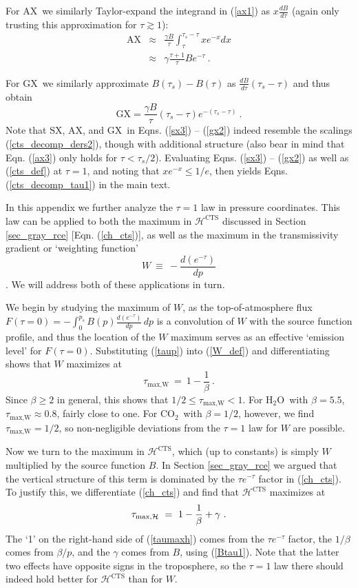 \documentclass{ametsoc}
\newcommand{\beqn}{\begin{equation}}
\newcommand{\eeqn}{\end{equation}}
\newcommand{\beqa}{\begin{eqnarray}}
\newcommand{\eeqa}{\end{eqnarray}}
\newcommand{\n}{\nonumber}
\newcommand{\eqnref}[1]{(\ref{#1})}
\newcommand{\der}[2]{\ensuremath{\frac{d #1}{d #2}}}
\newcommand{\ps}{\ensuremath{p_s}}
\newcommand{\cotwo}{\ensuremath{\mathrm{CO_2}}}
\newcommand{\htwo}{\ensuremath{\mathrm{H_2O}}}
\newcommand{\ch}{\ensuremath{\mathcal{H}}}
\newcommand{\taus}{\ensuremath{\tau_s}}
\newcommand{\taumaxw}{\ensuremath{\tau_{\text{max,W}}}}
\newcommand{\taumaxh}{\ensuremath{\tau_{\text{max,\ch}}}}
\newcommand{\SX}{\ensuremath{\mathrm{SX}}}
\newcommand{\AX}{\ensuremath{\mathrm{AX}}}
\newcommand{\GX}{\ensuremath{\mathrm{GX}}}
\newcommand{\CTS}{\ensuremath{\mathrm{CTS}}}
\begin{document}
 For \AX\ we similarly Taylor-expand the integrand in \eqnref{ax1} as $x\frac{d B}{d \tau}$ (again only trusting this approximation for  $\tau \gtrsim 1$):
\beqa
 	\AX &  \approx  &    \frac{\gamma B}{ \tau} \int_\tau^{\taus - \tau} x e^{-x} dx \n 	  \\
		   &  \approx  & \gamma \frac{\tau+1}{\tau}B e^{-\tau}  \ . \label{ax3} 
\eeqa

For \GX\  we similarly approximate $B(\taus) - B(\tau)$ as $\der{B}{\tau} (\taus-\tau)$ and thus obtain
\beqn
	\GX  =    \frac{\gamma B}{\tau}(\taus-\tau)e^{-(\taus-\tau)}  \ .
	\label{gx2}
\eeqn
Note that \SX, \AX, and \GX\  in  Eqns. \eqnref{sx3} -- \eqnref{gx2} indeed resemble the scalings \eqnref{cts_decomp_ders2}, though with additional structure (also bear in mind that Eqn. \eqnref{ax3} only holds for $\tau < \taus/2$).  Evaluating Eqns. \eqnref{sx3} -- \eqnref{gx2} as well as  \eqnref{cts_def} at $\tau=1$, and noting that $xe^{-x}\leq 1/e$, then yields Eqns. \eqnref{cts_decomp_tau1} in the main text.


\appendix[B]
\label{appendix_tau1}
In this appendix we further analyze the $\tau=1$ law in pressure coordinates. This law can be applied to both the maximum in $\ch^{\CTS}$  discussed in Section \ref{sec_gray_rce} [Eqn. \eqnref{ch_cts}], as well as the maximum in the transmissivity gradient or `weighting function' 
\beqn
	W\ \equiv \ - \der{(e^{-\tau})}{p}
\label{W_def}
\eeqn
 \citep[e.g.][]{wallace2006,petty2006}. We will address both of these applications in turn. 

We begin by studying the maximum of $W$, as the top-of-atmosphere flux $F(\tau=0)=-\int_0^{\ps} B(p)\der{(e^{-\tau})}{p}\, dp$ is a convolution of $W$ with the source function profile, and thus the location of the $W$ maximum serves as an effective `emission level' for $F(\tau=0)$. Substituting \eqnref{taup} into \eqnref{W_def} and differentiating shows that $W$ maximizes at
\beqn
	\taumaxw \ = \ 1 - \frac{1}{\beta}  \ .
	\label{taumaxw}
\eeqn
Since $\beta \geq 2 $ in general, this shows that $1/2 \leq \taumaxw  < 1$. For \htwo\ with $\beta = 5.5$, $\taumaxw \approx 0.8$, fairly close to one. For \cotwo\ with $\beta = 1/2$, however, we find $\taumaxw = 1/2$, so non-negligible deviations from the $\tau=1$ law for $W$ are possible.

Now we turn to the maximum in $\ch^{\CTS}$, which (up to constants) is simply $W$ multiplied by the source function $B$. In Section \ref{sec_gray_rce} we argued that the vertical structure of this term is dominated by the $\tau e^{-\tau}$ factor in \eqnref{ch_cts}. To justify this, we  differentiate \eqnref{ch_cts} and find that $\ch^{\CTS}$ maximizes at 
\beqn
	\taumaxh \ = \ 1 - \frac{1}{\beta}  + \gamma \ .
	\label{taumaxh}
\eeqn
The `1' on the right-hand side of \eqnref{taumaxh} comes from the $\tau e^{-\tau}$ factor, the $1/\beta$ comes from $\beta/p$, and the $\gamma$ comes from $B$, using \eqnref{Btau1}. Note that the latter two effects have opposite signs in the troposphere, so the $\tau=1$ law there should indeed hold better for $\ch^{\CTS}$ than for $W$. 
\end{document}
